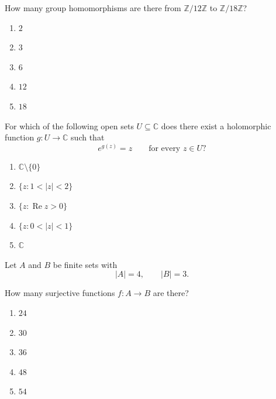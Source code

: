 \begin{exercise}
How many group homomorphisms are there
from $\mathbb Z/12\mathbb Z$ to
$\mathbb Z/18\mathbb Z$?
\begin{enumerate}[label=(\Alph*)]
\item $2$
\item $3$
\item $6$
\item $12$
\item $18$
\end{enumerate}
\end{exercise}

\begin{exercise}
For which of the following open sets
$U\subseteq\mathbb C$ does there exist
a holomorphic function $g:U\to\mathbb C$
such that
\[
e^{g(z)}=z
\qquad\text{for every }z\in U?
\]
\begin{enumerate}[label=(\Alph*)]
\item $\mathbb C\setminus\{0\}$
\item $\{z:1<|z|<2\}$
\item $\{z:\operatorname{Re}z>0\}$
\item $\{z:0<|z|<1\}$
\item $\mathbb C$
\end{enumerate}
\end{exercise}

\begin{exercise}
Let $A$ and $B$ be finite sets with
\[
|A|=4,\qquad |B|=3.
\]

How many surjective functions
$f:A\to B$ are there?
\begin{enumerate}[label=(\Alph*)]
\item $24$
\item $30$
\item $36$
\item $48$
\item $54$
\end{enumerate}
\end{exercise}
